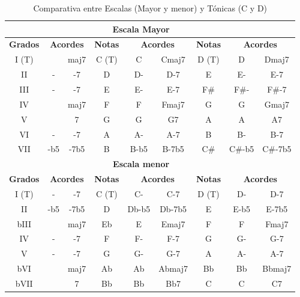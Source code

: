 \begin{table}[h]
    \centering
    \begin{tabular}{c|c|c||c|c|c||c|c|c}
        \multicolumn{3}{c}{} & \multicolumn{3}{c}{\textbf{Escala Mayor}}  \\
        \hline  
        \multicolumn{1}{c|}{\textbf{Grados}} & \multicolumn{2}{c||}{\textbf{Acordes}} & \multicolumn{1}{c|}{\textbf{Notas}} & \multicolumn{2}{c||}{\textbf{Acordes}} & \multicolumn{1}{c|}{\textbf{Notas}} & \multicolumn{2}{c}{\textbf{Acordes}} \\
           \hline
    I (T) &     & maj7 & C (T) & C    & Cmaj7 & D (T)   & D      & Dmaj7   \\
        II & -   & -7   &    D  & D-   & D-7   &    E    & E-     & E-7     \\
        III & -   & -7   &    E  & E-   & E-7   &    F\#  & F\#-   & F\#-7   \\
        IV &     & maj7 &    F  & F    & Fmaj7 &    G    & G      & Gmaj7   \\
        V &     & 7    &    G  & G    & G7    &    A    & A      & A7      \\
        VI & -   & -7   &    A  & A-   & A-7   &    B    & B-     & B-7     \\
        VII & -b5 & -7b5 &    B  & B-b5 & B-7b5 &    C\#  & C\#-b5 & C\#-7b5 \\
        \hline
        \multicolumn{3}{c}{} & \multicolumn{3}{c}{\textbf{Escala menor}}  \\
        \hline  
        \multicolumn{1}{c|}{\textbf{Grados}} & \multicolumn{2}{c||}{\textbf{Acordes}} & \multicolumn{1}{c|}{\textbf{Notas}} & \multicolumn{2}{c||}{\textbf{Acordes}} & \multicolumn{1}{c|}{\textbf{Notas}} & \multicolumn{2}{c}{\textbf{Acordes}} \\
           \hline 
    I (T)  & -   & -7   & C (T)  & C-    & C-7    & D (T) & D-   & D-7    \\
        II  & -b5 & -7b5 &    D   & Db-b5 & Db-7b5 &    E  & E-b5 & E-7b5  \\
        bIII &     & maj7 &    Eb  & E     & Emaj7  &    F  & F    & Fmaj7  \\
        IV  & -   & -7   &    F   & F-    & F-7    &    G  & G-   & G-7    \\
        V  & -   & -7   &    G   & G-    & G-7    &    A  & A-   & A-7    \\
        bVI &     & maj7 &    Ab  & Ab    & Abmaj7 &    Bb & Bb   & Bbmaj7 \\
        bVII &     & 7    &    Bb  & Bb    & Bb7    &    C  & C    & C7     \\

    \end{tabular}
    \caption{Comparativa entre Escalas (Mayor y menor) y Tónicas (C y D)}
    \label{tab:comparativa_scalas}
\end{table}

